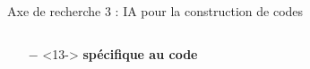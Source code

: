 \documentclass[t,compress,mathserif,12pt,xcolor=dvipsnames]{beamer}
\newcommand{\RED} [1]{\textcolor{Paired-5}{\textbf{#1}}}
\begin{document}
\begin{frame}[t]{Axe de recherche 3 : IA pour la construction de codes}
\begin{minipage}[t][5.0cm][t]{\textwidth}
\begin{columns}[T]
\begin{column}{0.45\textwidth}
{\begin{itemize}
          \item[\RED{$-$}]  <13-> \RED  {spécifique au code}
        \end{itemize}
        }
      \end{column}
      \begin{column}{0.04\textwidth}
      \end{column}
      \begin{column}{0.45\textwidth}
        \vspace*{-1.1cm}
        \begin{center}

\end{center}
\end{column}
\end{columns}
\end{minipage}
\end{frame}
\end{document}
